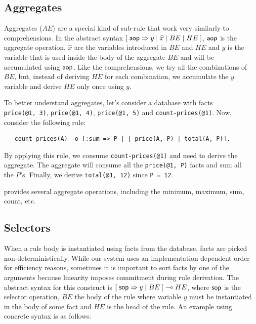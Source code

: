 \subsection{Aggregates}

Aggregates ($AE$) are a special kind of sub-rule that work very similarly to comprehensions.
In the abstract syntax $[\;\mathsf{aop} \Rightarrow y \; | \; \widehat{x} \; | \; BE \; |
\; HE \;]$, $\mathsf{aop}$ is the aggregate operation, $\widehat{x}$ are the variables
introduced in $BE$ and $HE$ and $y$ is the variable that is used inside the body
of the aggregate $BE$ and will be accumulated using $\mathsf{aop}$. Like the comprehensions,
we try all the combinations of $BE$, but, instead of deriving $HE$ for each combination,
we accumulate the $y$ variable and derive $HE$ only once using $y$.

To better understand aggregates, let's consider a database with facts
\texttt{price(@1,~3)}, \texttt{price(@1,~4)}, \texttt{price(@1,~5)} and
\texttt{count-prices(@1)}. Now, consider the following rule:

\begin{Verbatim}
   count-prices(A) -o [:sum => P | | price(A, P) | total(A, P)].
\end{Verbatim}

By applying this rule, we consume \texttt{count-prices(@1)} and need to
derive the aggregate. The aggregate will consume all the \texttt{price(@1, P)} facts
and sum all the $P$'s. Finally, we derive \texttt{total(@1, 12)} since \texttt{P = 12}.

\lang provides several aggregate operations, including the minimum, maximum, sum, count, etc.

\subsection{Selectors}

When a rule body is instantiated using facts from the database, facts are picked
non-deterministically. While our system uses an implementation dependent order for
efficiency reasons, sometimes it is important to sort facts by one of the arguments
because linearity imposes commitment during rule derivation. The abstract syntax for
this construct is $[\; \mathsf{sop} \Rightarrow y \; | \; BE \;] \multimap HE$, where
$\mathsf{sop}$ is the selector operation, $BE$ the body of the rule where variable $y$
must be instantiated in the body of some fact and $HE$ is the head of the rule.
An example using concrete syntax is as follows:

